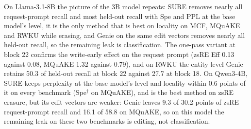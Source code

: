 \documentclass{article}
\theoremstyle{remark}
\theoremstyle{definition}
\begin{document}
On Llama-3.1-8B the picture of the 3B model repeats: SURE removes nearly all request-prompt recall and most held-out recall with Spe and PPL at the base model's level, it is the only method that is best on locality on MCF, MQuAKE and RWKU while erasing, and Genie on the same edit vectors removes nearly all held-out recall, so the remaining leak is classification. The one-pass variant at block 22 confirms the write-early effect on the request prompt (zsRE Eff 0.13 against 0.08, MQuAKE 1.32 against 0.79), and on RWKU the entity-level Genie retains 50.3 of held-out recall at block 22 against 27.7 at block 18. On Qwen3-4B, SURE keeps perplexity at the base model's level and locality within 0.6 points of it on every benchmark (Spe$^\dagger$ on MQuAKE), and is the best method on zsRE erasure, but its edit vectors are weaker: Genie leaves 9.3 of 30.2 points of zsRE request-prompt recall and 16.1 of 58.8 on MQuAKE, so on this model the remaining leak on these two benchmarks is editing, not classification.
\end{document}
